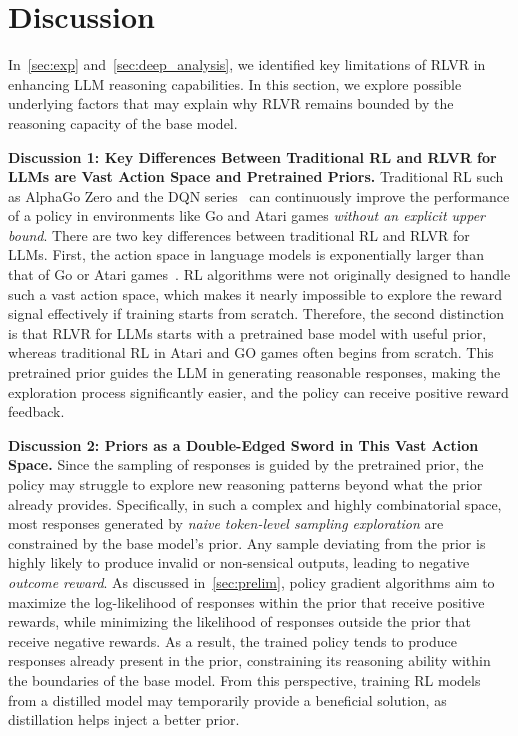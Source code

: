 \vspace{-0.5mm}
\section{Discussion}
\vspace{-0.5mm}
\label{sec:discuss}
In~\cref{sec:exp} and~\cref{sec:deep_analysis}, we identified key limitations of RLVR in enhancing LLM reasoning capabilities. In this section, we explore possible underlying factors that may explain why RLVR remains bounded by the reasoning capacity of the base model.

\textbf{Discussion 1: Key Differences Between Traditional RL and RLVR for LLMs are Vast Action Space and Pretrained Priors.}
Traditional RL such as AlphaGo Zero and the DQN series~\cite{silver2017alphagozero,mnih2015dqn,yue2023value} can continuously improve the performance of a policy in environments like Go and Atari games \textit{without an explicit upper bound}. There are two key differences between traditional RL and RLVR for LLMs.
First, the action space in language models is exponentially larger than that of Go or Atari games~\cite{rl4nlp}. 
RL algorithms were not originally designed to handle such a vast action space, which makes it nearly impossible to explore the reward signal effectively if training starts from scratch. 
Therefore, the second distinction is that RLVR for LLMs starts with a pretrained base model with useful prior, whereas traditional RL in Atari and GO games often begins from scratch. 
This pretrained prior guides the LLM in generating reasonable responses, making the exploration process significantly easier, and the policy can receive positive reward feedback.

\textbf{Discussion 2: Priors as a Double-Edged Sword in This Vast Action Space.}
Since the sampling of responses is guided by the pretrained prior, the policy may struggle to explore new reasoning patterns beyond what the prior already provides. 
Specifically, in such a complex and highly combinatorial space, most responses generated by \textit{naive token-level sampling exploration} are constrained by the base model's prior. 
Any sample deviating from the prior is highly likely to produce invalid or non-sensical outputs, leading to negative \textit{outcome reward}.
As discussed in~\cref{sec:prelim}, policy gradient algorithms aim to maximize the log-likelihood of responses within the prior that receive positive rewards, while minimizing the likelihood of responses outside the prior that receive negative rewards. 
As a result, the trained policy tends to produce responses already present in the prior, constraining its reasoning ability within the boundaries of the base model.
From this perspective, training RL models from a distilled model may temporarily provide a beneficial solution, as distillation helps inject a better prior. 

